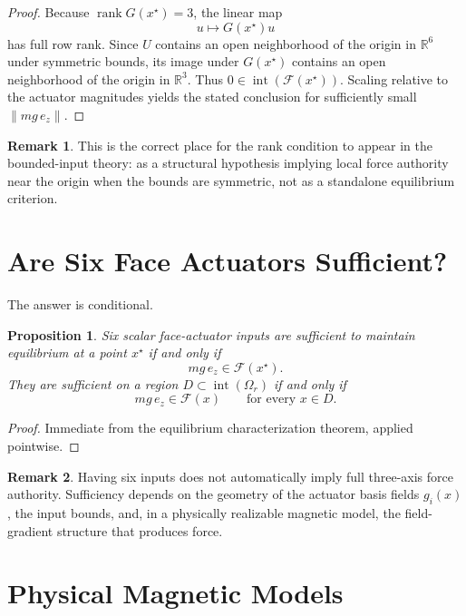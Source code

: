 \documentclass[11pt]{article}
\newtheorem{proposition}{Proposition}
\theoremstyle{definition}
\newtheorem{remark}{Remark}
\begin{document}
\begin{proof}
Because \(\operatorname{rank}G(x^\star)=3\), the linear map
\[
u \mapsto G(x^\star)u
\]
has full row rank. Since \(U\) contains an open neighborhood of the origin in \(\mathbb{R}^6\) under symmetric bounds, its image under \(G(x^\star)\) contains an open neighborhood of the origin in \(\mathbb{R}^3\). Thus \(0 \in \operatorname{int}(\mathcal{F}(x^\star))\). Scaling relative to the actuator magnitudes yields the stated conclusion for sufficiently small \(\|mg\,e_z\|\).
\end{proof}

\begin{remark}
This is the correct place for the rank condition to appear in the bounded-input theory: as a structural hypothesis implying local force authority near the origin when the bounds are symmetric, not as a standalone equilibrium criterion.
\end{remark}

\section{Are Six Face Actuators Sufficient?}

The answer is conditional.

\begin{proposition}
Six scalar face-actuator inputs are sufficient to maintain equilibrium at a point \(x^\star\) if and only if
\[
mg\,e_z \in \mathcal{F}(x^\star).
\]
They are sufficient on a region \(D \subset \operatorname{int}(\Omega_r)\) if and only if
\[
mg\,e_z \in \mathcal{F}(x)
\qquad \text{for every } x \in D.
\]
\end{proposition}

\begin{proof}
Immediate from the equilibrium characterization theorem, applied pointwise.
\end{proof}

\begin{remark}
Having six inputs does not automatically imply full three-axis force authority. Sufficiency depends on the geometry of the actuator basis fields \(g_i(x)\), the input bounds, and, in a physically realizable magnetic model, the field-gradient structure that produces force.
\end{remark}

\section{Physical Magnetic Models}
\end{document}

